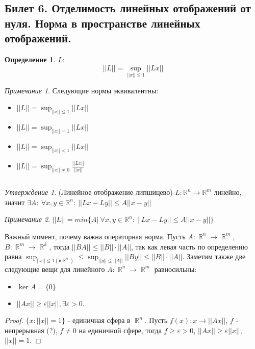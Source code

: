 \documentclass[a4paper]{article}
\theoremstyle{indented}
\theoremstyle{definition}
\newtheorem{defn}{Определение}
\theoremstyle{remark}
\newtheorem{remark}{Примечание}
\newtheorem{stat}{Утверждение}
\DeclareMathOperator{\RR}{\mathbb{R}}
\begin{document}
\subsection{Билет 6. Отделимость линейных отображений от нуля. Норма в пространстве линейных отображений.}


\begin{defn}
     $L$:
    $$
        ||L|| = \sup_{||x|| \leq 1} ||Lx||
    $$
\end{defn}

\begin{remark}
    Следующие нормы эквивалентны: 
    \begin{itemize}
        \item $||L|| = \sup_{||x|| \leq 1} ||Lx||$
        \item $||L|| = \sup_{||x|| = 1} ||Lx||$
        \item $||L|| = \sup_{||x|| < 1} ||Lx||$
        \item $||L|| = \sup_{||x|| \not= 0} \frac{||Lx||}{||x||}$
    \end{itemize}
    $$$$
\end{remark}

\begin{stat}
    (Линейное отображение липшицево)
    $L: \mathbb{R}^n \to \mathbb{R}^m$ линейно, значит $\exists A: \ \forall x,y \in \mathbb{R}^n: \ ||Lx-Ly|| \leq A||x-y||$
\end{stat}

\begin{remark}
    $||L||=min\{A \big| \   \forall x,y \in \mathbb{R}^n: \ ||Lx-Ly|| \leq A||x-y||\}$
\end{remark}

Важный момент, почему важна операторная норма. Пусть $A:\RR^n\rightarrow \RR^m$, $B:\RR^m\rightarrow \RR^k$, тогда $||BA||\leq ||B||\cdot||A||$, так как левая часть по определению равна $\sup_{||x||\leq 1 (в \RR^n)}\leq \sup_{||y||\leq||A||}||By||\leq ||B||\cdot||A||$. Заметим также две следующие вещи для линейного $A:\RR^n\rightarrow \RR^m$ равносильны: \ 

\begin{itemize}
    \item $\ker A=\{0\}$
    \item $||Ax||\geq \varepsilon ||x||, \exists \varepsilon >0$. 
\end{itemize}

\begin{proof}
    $\{x:||x||=1\}$ - единичная сфера в $\RR^n$. Пусть $f(x):x\rightarrow ||Ax||$, $f$ - непрерывная (?), $f\neq 0$ на единичной сфере, тогда $f\geq \varepsilon >0$, $||Ax||\geq \varepsilon||x||$, $||x||=1$. 
\end{proof}
\end{document}
